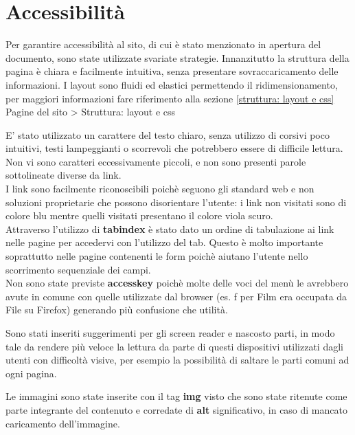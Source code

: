 \section{Accessibilità}

Per garantire accessibilità al sito, di cui è stato menzionato in apertura del documento, sono state utilizzate svariate strategie.
Innanzitutto la struttura della pagina è chiara e facilmente intuitiva, senza presentare sovraccaricamento delle informazioni.
I layout sono fluidi ed elastici permettendo il ridimensionamento, per maggiori informazioni fare riferimento alla sezione \ref{struttura: layout e css} Pagine del sito > Struttura: layout e css

E' stato utilizzato un carattere del testo chiaro, senza utilizzo di corsivi poco intuitivi, testi lampeggianti o scorrevoli che potrebbero essere di difficile lettura.\\
Non vi sono caratteri eccessivamente piccoli, e non sono presenti parole sottolineate diverse da link.\\

I link sono facilmente riconoscibili poichè seguono gli standard web e non soluzioni proprietarie che possono disorientare l'utente: i link non visitati sono di colore blu mentre quelli visitati presentano il colore viola scuro.\\

Attraverso l'utilizzo di \textbf{tabindex} è stato dato un ordine di tabulazione ai link nelle pagine per accedervi con l'utilizzo del tab. Questo è molto importante soprattutto nelle pagine contenenti le form poichè aiutano l'utente nello scorrimento sequenziale dei campi.\\

Non sono state previste \textbf{accesskey} poichè molte delle voci del menù le avrebbero avute in comune con quelle utilizzate dal browser (es. f per Film era occupata da File su Firefox) generando più confusione che utilità.

Sono stati inseriti suggerimenti per gli screen reader e nascosto parti, in modo tale da rendere più veloce la lettura da parte di questi dispositivi utilizzati dagli utenti con difficoltà visive, per esempio la possibilità di saltare le parti comuni ad ogni pagina.


\n Le immagini sono state inserite con il tag \textbf{img} visto che sono state ritenute come parte integrante del contenuto e corredate di \textbf{alt} significativo, in caso di mancato caricamento dell'immagine.

